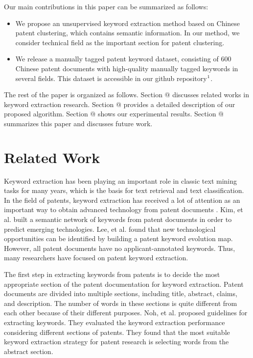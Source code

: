 \documentclass[conference]{IEEEtran}
\makeatletter
\newcommand{\Rmnum}[1]{\expandafter\@slowromancap\romannumeral #1@}
\makeatother
\begin{document}
\begin{CJK}{UTF8}{gbsn}
	Our main contributions in this paper can be summarized as follows:
	\begin{itemize}
	\item We propose an unsupervised keyword extraction method based on Chinese patent clustering, which contains semantic information. In our method, we consider technical field as the important section for patent clustering.
	\item We release a manually tagged patent keyword dataset, consisting of 600 Chinese patent documents with high-quality manually tagged keywords in several fields. This dataset is accessible in our github repository$\footnote{\url{https://github.com/NoteXYX/Manually-tagged-patent-keyword-dataset}}$.
	\end{itemize}

	The rest of the paper is organized as follows. Section \Rmnum{2} discusses related works in keyword extraction research. Section \Rmnum{3} provides a detailed description of our proposed algorithm. Section \Rmnum{4} shows our experimental results. Section \Rmnum{5} summarizes this paper and discusses future work.
	
	
	\section{Related Work}
	Keyword extraction has been playing an important role in classic text mining tasks for many years, which is the basis for text retrieval and text classification. In the field of patents, keyword extraction has received a lot of attention as an important way to obtain advanced technology from patent documents \cite{b11}. Kim, et al. \cite{b12} built a semantic network of keywords from patent documents in order to predict emerging technologies. Lee, et al. \cite{b13} found that new technological opportunities can be identified by building a patent keyword evolution map. However, all patent documents have no applicant-annotated keywords. Thus, many researchers have focused on patent keyword extraction.
	
	The first step in extracting keywords from patents is to decide the most appropriate section of the patent documentation for keyword extraction. Patent documents are divided into multiple sections, including title, abstract, claims, and description. The number of words in these sections is quite different from each other because of their different purposes. Noh, et al. \cite{b14} proposed guidelines for extracting keywords. They evaluated the keyword extraction performance considering different sections of patents. They found that the most suitable keyword extraction strategy for patent research is selecting words from the abstract section.
	

\end{CJK}
\end{document}
